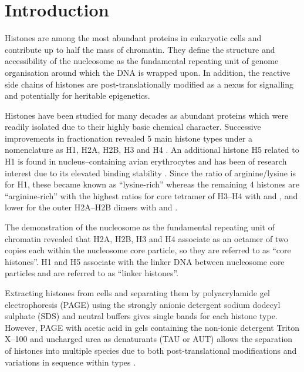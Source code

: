 \section{Introduction}

  Histones are among the most abundant proteins in eukaryotic cells and contribute up
  to half the mass of chromatin. They define the structure and accessibility of the
  nucleosome as the fundamental repeating unit of genome organisation around which
  the DNA is wrapped upon. In addition, the reactive
  side chains of histones are post-translationally modified as a nexus for signalling
  and potentially for heritable epigenetics.

  Histones have been studied for many decades as abundant proteins which were readily
  isolated due to their highly basic chemical character. Successive improvements in
  fractionation revealed 5 main histone types under a nomenclature as H1, H2A, H2B, H3
  and H4 \citep{nomenclature}. An additional histone H5 related to H1 is found in
  nucleus--containing avian erythrocytes and has been of research interest due to its
  elevated binding stability \citep{HFive-review}.
  Since the ratio of arginine/lysine is \LinkerArgLysRatio{}
  for H1, these became known as ``lysine-rich'' whereas the remaining 4 histones are
  ``arginine-rich'' with the highest ratios for core tetramer of H3--H4 with \HThreeArgLysRatio{}
  and \HFourArgLysRatio{}, and lower for the outer H2A--H2B dimers with \HTwoAArgLysRatio{}
  and \HTwoBArgLysRatio{}.

  The demonstration of the nucleosome as the fundamental repeating unit of chromatin revealed
  that H2A, H2B, H3 and H4 associate as an octamer of two copies each within the
  nucleosome core particle, so they are referred to as ``core histones''. H1 and H5
  associate with the linker DNA between nucleosome core particles and are referred to
  as ``linker histones''.

  Extracting histones from cells and separating them by polyacrylamide gel electrophoresis
  (PAGE) using the strongly anionic detergent sodium dodecyl sulphate (SDS) and neutral
  buffers gives single bands for each histone type. However, PAGE with acetic acid in gels
  containing the non-ionic detergent Triton X--100 and uncharged urea as denaturants
  (TAU or AUT) allows the separation of histones into multiple species due to both
  post-translational modifications and variations in sequence within types \citep{PAGEND}.

